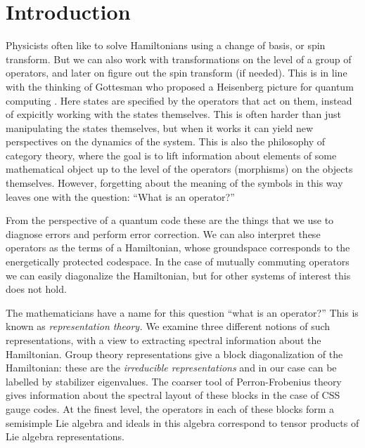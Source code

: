 \documentclass[11pt,oneside]{article}
\begin{document}
%
%

\section{Introduction}

Physicists often like to solve Hamiltonians 
using a change of basis, or spin transform.
But we can also work with transformations on the level of a
group of operators,
and later on figure out the spin transform (if needed).
This is in line with the thinking of 
Gottesman who proposed a Heisenberg picture for quantum computing \cite{Gottesman1998}.
Here states are specified by the operators that act on them, instead of
expicitly working with the states themselves.
This is often harder than just manipulating the
states themselves, but when it works it can yield
new perspectives on the dynamics of the system.
This is also
the philosophy of category theory, where the goal is to lift
information about elements of some mathematical object
up to the level of the operators (morphisms) on the
objects themselves.
However, forgetting about the meaning of the symbols in this way 
leaves one with the question:
``What is an operator?''

From the perspective of a quantum code these are the
things that we use to diagnose errors and perform error correction.
We can also interpret these operators as the terms of a Hamiltonian, whose
groundspace corresponds to the energetically protected codespace.
In the case of mutually commuting operators we can easily diagonalize the
Hamiltonian, but for other systems of interest this does not hold.

The mathematicians have a name for this question ``what is an operator?''
This is known as \emph{representation theory.}
We examine three different notions of
such representations, with a view to extracting
spectral information about the Hamiltonian.
Group theory representations give 
a block diagonalization of the Hamiltonian:
these are the \emph{irreducible representations} and in
our case can be labelled by stabilizer eigenvalues.
The coarser tool of Perron-Frobenius theory \cite{Perron1907, Frobenius1912, Baez2012}
gives information about the
spectral layout of these blocks in the case of CSS gauge codes.
At the finest level, the operators in each of these blocks form a semisimple Lie
algebra and ideals in this algebra correspond to tensor products of
Lie algebra representations. 
\end{document}
